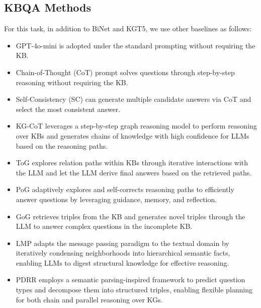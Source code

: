 


\subsection{KBQA Methods} \label{appendix:baseline:kbqa}
For this task, in addition to BiNet and KGT5, we use other baselines as follows:
\begin{itemize}[left=0pt]
\item GPT-4o-mini is adopted under the standard prompting\cite{brown2020languagemodelsfewshotlearners} without requiring the KB.
\item Chain-of-Thought (CoT) prompt \cite{wei2023chainofthoughtpromptingelicitsreasoning} solves questions through step-by-step reasoning without requiring the KB.
\item Self-Consistency (SC) \cite{wang2023selfconsistencyimproveschainthought} can generate multiple candidate answers via CoT and select the most consistent answer.
\item KG-CoT \cite{DBLP:conf/ijcai/Zhao0W0024} leverages a step-by-step graph reasoning model to perform reasoning over KBs and generates chains of knowledge with high confidence for LLMs based on the reasoning paths.
\item ToG \cite{sun2023thinkongraph} explores relation paths within KBs through iterative interactions with the LLM and let the LLM derive final answers based on the retrieved paths.
\item PoG \cite{Plan-on-Graph} adaptively explores and self-corrects reasoning paths to efficiently answer questions by leveraging guidance, memory, and reflection.
\item GoG \cite{xu-etal-2024-generate} retrieves triples from the KB and generates novel triples through the LLM to answer complex questions in the incomplete KB.
\item LMP \cite{lmp} adapts the message passing paradigm to the textual domain by iteratively condensing neighborhoods into hierarchical semantic facts, enabling LLMs to digest structural knowledge for effective reasoning.
\item PDRR \cite{pdrr} employs a semantic parsing-inspired framework to predict question types and decompose them into structured triples, enabling flexible planning for both chain and parallel reasoning over KGs.
\end{itemize}


